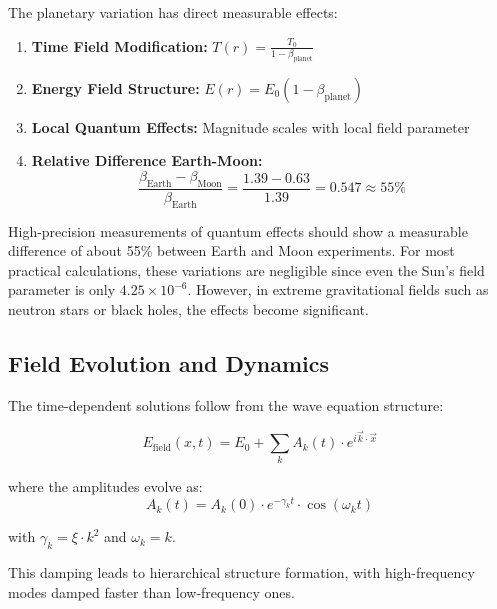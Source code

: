 \documentclass[12pt,a4paper]{article}
\theoremstyle{definition}
\begin{document}
The planetary variation has direct measurable effects:

\begin{enumerate}
	\item \textbf{Time Field Modification:} $T(r) = \frac{T_0}{1 - \beta_{\text{planet}}}$
	
	\item \textbf{Energy Field Structure:} $E(r) = E_0(1 - \beta_{\text{planet}})$
	
	\item \textbf{Local Quantum Effects:} Magnitude scales with local field parameter
	
	\item \textbf{Relative Difference Earth-Moon:}
	\begin{equation}
		\frac{\beta_{\text{Earth}} - \beta_{\text{Moon}}}{\beta_{\text{Earth}}} = \frac{1.39 - 0.63}{1.39} = 0.547 \approx 55\%
	\end{equation}
\end{enumerate}

\begin{wichtig}
	High-precision measurements of quantum effects should show a measurable difference of about 55\% between Earth and Moon experiments. For most practical calculations, these variations are negligible since even the Sun's field parameter is only $4.25 \times 10^{-6}$. However, in extreme gravitational fields such as neutron stars or black holes, the effects become significant.
\end{wichtig}

\subsection{Field Evolution and Dynamics}

The time-dependent solutions follow from the wave equation structure:

\begin{equation}
	E_{\text{field}}(x,t) = E_0 + \sum_k A_k(t) \cdot e^{i\vec{k}\cdot\vec{x}}
\end{equation}

where the amplitudes evolve as:
\begin{equation}
	A_k(t) = A_k(0) \cdot e^{-\gamma_k t} \cdot \cos(\omega_k t)
\end{equation}

with $\gamma_k = \xi \cdot k^2$ and $\omega_k = k$.

This damping leads to hierarchical structure formation, with high-frequency modes damped faster than low-frequency ones.
\end{document}
